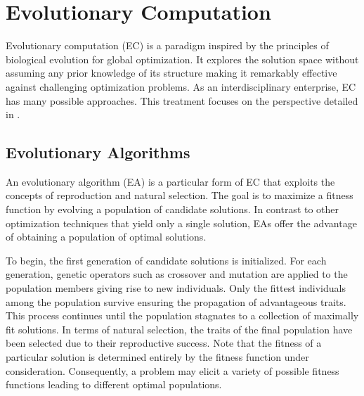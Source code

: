 \documentclass[12pt]{report}
\begin{document}
 
 
 
 
 
\section{Evolutionary Computation}
Evolutionary computation (EC) is a paradigm inspired by the principles of biological evolution for global optimization. It explores the solution space without assuming any prior knowledge of its structure making it remarkably effective against challenging optimization problems. As an interdisciplinary enterprise, EC has many possible approaches. This treatment focuses on the perspective detailed in \citet{ashlock2010}. 





\subsection{Evolutionary Algorithms}
An evolutionary algorithm (EA) is a particular form of EC that exploits the concepts of reproduction and natural selection. The goal is to maximize a fitness function by evolving a population of candidate solutions. In contrast to other optimization techniques that yield only a single solution, EAs offer the advantage of obtaining a population of optimal solutions. 

To begin, the first generation of candidate solutions is initialized. For each generation, genetic operators such as crossover and mutation are applied to the population members giving rise to new individuals. Only the fittest individuals among the population survive ensuring the propagation of advantageous traits. This process continues until the population stagnates to a collection of maximally fit solutions.  In terms of natural selection, the traits of the final population have been selected due to their reproductive success. Note that the fitness of a particular solution is determined entirely by the fitness function under consideration. Consequently, a problem may elicit a variety of possible fitness functions leading to different optimal populations. 




\end{document}
